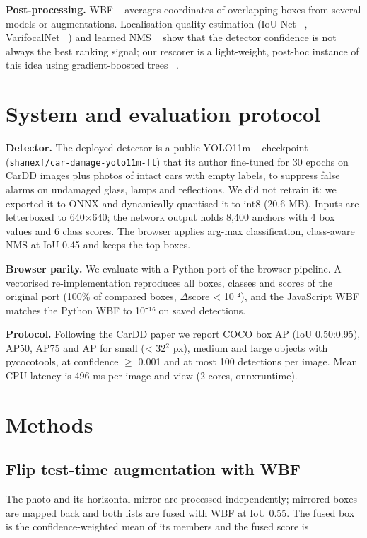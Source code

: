 \documentclass[10pt,twocolumn]{article}
\begin{document}
\textbf{Post-processing.} WBF ~\cite{wbf} averages coordinates of overlapping boxes from several models or augmentations. Localisation-quality estimation (IoU-Net ~\cite{iounet}, VarifocalNet ~\cite{vfnet}) and learned NMS ~\cite{learnnms} show that the detector confidence is not always the best ranking signal; our rescorer is a light-weight, post-hoc instance of this idea using gradient-boosted trees ~\cite{gbm,lightgbm}.

\section{System and evaluation protocol}
\textbf{Detector.} The deployed detector is a public YOLO11m ~\cite{yolo11} checkpoint (\texttt{shanexf/car-damage-yolo11m-ft}) that its author fine-tuned for 30 epochs on CarDD images plus photos of intact cars with empty labels, to suppress false alarms on undamaged glass, lamps and reflections. We did not retrain it: we exported it to ONNX and dynamically quantised it to int8 (20.6 MB). Inputs are letterboxed to 640$\times$640; the network output holds 8,400 anchors with 4 box values and 6 class scores. The browser applies arg-max classification, class-aware NMS at IoU 0.45 and keeps the top boxes.

\textbf{Browser parity.} We evaluate with a Python port of the browser pipeline. A vectorised re-implementation reproduces all boxes, classes and scores of the original port (100\% of compared boxes, $\Delta$score < 10⁻⁴), and the JavaScript WBF matches the Python WBF to 10⁻¹⁶ on saved detections.

\textbf{Protocol.} Following the CarDD paper we report COCO box AP (IoU 0.50:0.95), AP50, AP75 and AP for small (< 32$^2$ px), medium and large objects with pycocotools, at confidence $\ge$ 0.001 and at most 100 detections per image. Mean CPU latency is 496 ms per image and view (2 cores, onnxruntime).

\section{Methods}
\subsection{Flip test-time augmentation with WBF}
The photo and its horizontal mirror are processed independently; mirrored boxes are mapped back and both lists are fused with WBF at IoU 0.55. The fused box is the confidence-weighted mean of its members and the fused score is
\end{document}
